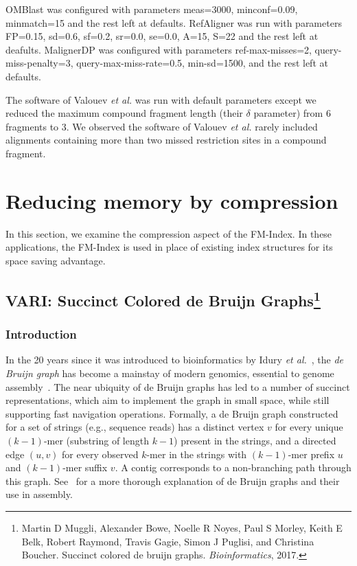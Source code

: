 OMBlast was configured with parameters meas=3000, minconf=0.09, minmatch=15 and the rest left at defaults.  RefAligner was run with parameters FP=0.15, sd=0.6, sf=0.2, sr=0.0, se=0.0, A=15, S=22 and the rest left at deafults.  MalignerDP was configured with parameters ref-max-misses=2, query-miss-penalty=3, query-max-miss-rate=0.5, min-sd=1500, and the rest left at defaults.

The software of Valouev {\it et al.} was run with default parameters except we reduced the maximum compound fragment length (their $\delta$ parameter) from 6 fragments to 3. We observed the software of Valouev {\it et al.} rarely included alignments containing more than two missed restriction sites in a compound fragment.






\chapter{Reducing memory by compression}
\bigskip

In this section, we examine the compression aspect of the FM-Index.  In these applications, the FM-Index is used in place of existing index structures for its space saving advantage.  
\section[VARI: Succinct Colored de Bruijn Graphs]{VARI: Succinct Colored de Bruijn Graphs\protect\footnote{ Martin D Muggli, Alexander Bowe, Noelle R Noyes, Paul S Morley, Keith E Belk, Robert
		Raymond, Travis Gagie, Simon J Puglisi, and Christina Boucher. Succinct colored de bruijn
		graphs. {\it Bioinformatics}, 2017.
}}
\subsection{Introduction}

In the 20 years since it was introduced to bioinformatics by Idury {\it et al.}~\cite{IW95}, the \emph{de Bruijn graph} has become a mainstay of modern genomics, essential to genome assembly~\citep{how,sequel,ismb2015}. The near ubiquity of de Bruijn graphs has led to a number of succinct representations, which aim to implement the graph in small space, while still supporting fast navigation operations.  Formally, a de Bruijn graph constructed for a set of strings (e.g., sequence reads) has a distinct vertex $v$ for every unique $(k - 1)$-mer (substring of length $k - 1$) present in the strings, and a directed edge $(u, v)$ for every observed $k$-mer in the strings with $(k - 1)$-mer prefix $u$ and $(k - 1)$-mer suffix $v$. A contig corresponds to a non-branching path through this graph. See~\citep{how} for a more thorough explanation of de Bruijn graphs and their use in assembly.

